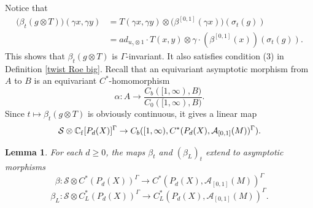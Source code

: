 \documentclass[11pt]{article}
\theoremstyle{definition}
\theoremstyle{plain}
\newtheorem{Lem}[Def]{Lemma}
\def\A{\mathcal A}\def\C{\mathcal C}\def\B{\mathcal B}\def\E{\mathcal E}\def\O{\mathcal O}\def\h{\mathfrak h}\def\K{\mathcal K}\def\F{\mathcal F}\def\P{\mathcal P}\def\L{\mathcal L}\def\R{\mathcal R}\def\Q{\mathcal Q}\def\H{\mathcal H}\def\S{\mathcal S}\def\N{\mathcal N}\def\U{\mathcal U}\def\V{\mathcal V}
\def\ox{\otimes}
\def\ox{\otimes}
\def\Ga{\Gamma}
\begin{document}
Notice that
\[\begin{split}\Big(\beta_t(g\ox T)\Big)(\gamma x,\gamma y)&=T(\gamma x,\gamma y)\ox\Big(\beta^{[0,1]}(\gamma x)\Big)(\sigma_t(g))\\
&=ad_{u_{\gamma}\ox 1}\cdot T(x,y)\ox \gamma\cdot(\beta^{[0,1]}(x))(\sigma_t(g)).\end{split}\]
This shows that $\beta_t(g\ox T)$ is $\Ga$-invariant. It also satisfies condition (3) in Definition \ref{twist Roe big}. Recall that an equivariant asymptotic morphism from $A$ to $B$ is an equivariant $C^*$-homomorphism
$$\alpha:A\to\frac{C_b([1,\infty),B)}{C_0([1,\infty),B)}.$$
Since $t\mapsto\beta_t(g\ox T)$ is obviously continuous, it gives a linear map
$$\S\ox \IC_{\rm f}[P_d(X)]^{\Ga}\to C_b([1,\infty),C^*(P_d(X),\A_{[0,1]}(M))^{\Ga}).$$

\begin{Lem}
For each $d\geq 0$, the maps $\beta_t$ and $(\beta_L)_t$ extend to asymptotic morphisms
$$\beta:\S\ox C^*(P_d(X))^{\Ga}\to C^*(P_d(X),\A_{[0,1]}(M))^{\Ga}$$
$$\beta_L:\S\ox C^*_L(P_d(X))^{\Ga}\to C^*_L(P_d(X),\A_{[0,1]}(M))^{\Ga}.$$
\end{Lem}
\end{document}

